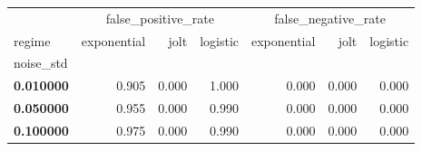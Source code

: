 \begin{tabular}{lrrrrrr}
\toprule
 & \multicolumn{3}{c}{false_positive_rate} & \multicolumn{3}{c}{false_negative_rate} \\
regime & exponential & jolt & logistic & exponential & jolt & logistic \\
noise_std &  &  &  &  &  &  \\
\midrule
\textbf{0.010000} & 0.905 & 0.000 & 1.000 & 0.000 & 0.000 & 0.000 \\
\textbf{0.050000} & 0.955 & 0.000 & 0.990 & 0.000 & 0.000 & 0.000 \\
\textbf{0.100000} & 0.975 & 0.000 & 0.990 & 0.000 & 0.000 & 0.000 \\
\bottomrule
\end{tabular}
